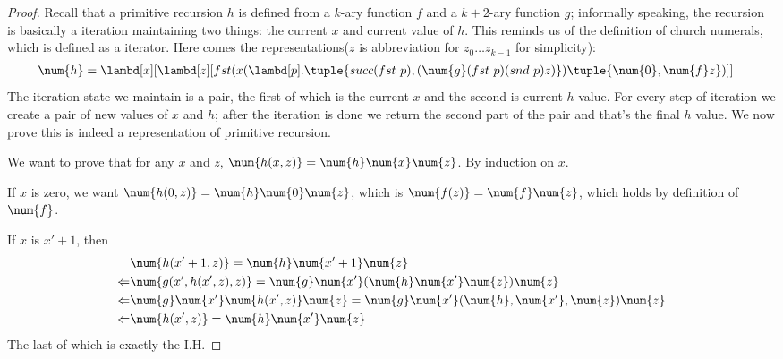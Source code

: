 \documentclass[../../../include/open-logic-section]{subfiles}
\begin{document}
\begin{proof}
  Recall that a primitive recursion $h$ is defined from a $k$-ary function $f$ and a $k+2$-ary function
  $g$; informally speaking, the recursion is basically a iteration
  maintaining two things: the current $x$ and current value of $h$. This
  reminds us of the definition of church numerals, which is defined as a
  iterator. Here comes the representations($z$ is abbreviation for $z_0
  \dots z_{k-1}$ for simplicity):
  \begin{align*}
    \num{h} &= \lambd[x][\lambd[z][fst (x (\lambd[p].\tuple{succ (fst ~ p),
              (\num{g} (fst ~ p) (snd ~ p) z)}) \tuple{\num{0}, \num{f} z})]]
  \end{align*}
  The iteration state we maintain is a pair, the first of which is the
  current $x$ and the second is current $h$ value. For every step of
  iteration we create a pair of new values of $x$ and $h$; after the
  iteration is done we return the second part of the pair and that's the
  final $h$ value. We now prove this is indeed a representation of
  primitive recursion.

  We want to prove that for any $x$ and $z$, $\num{h(x,z)} = \num{h}
  \num{x} \num{z}$. By induction on $x$.

  If $x$ is zero, we want $\num{h(0,z)} = \num{h} \num{0} \num{z}$,
  which is $\num{f(z)} = \num{f} \num{z}$, which holds by definition
  of $\num{f}$.
  
  If $x$ is $x'+1$, then
  \begin{align*}
    &\num{h(x'+1,z)} = \num{h} \num{x'+1} \num{z} \\
    \Leftarrow & \num{g(x',h(x',z),z)} = \num{g} \num{x'} (\num{h}
                 \num{x'} \num{z}) \num{z} \\
    \Leftarrow & \num{g} \num{x'} \num{h(x',z)} \num{z} = \num{g}
                 \num{x'} (\num{h}, \num{x'}, \num{z}) \num{z} \\
    \Leftarrow & \num{h(x',z)} = \num{h} \num{x'} \num{z}
  \end{align*}
  The last of which is exactly the I.H.
\end{proof}
\end{document}
